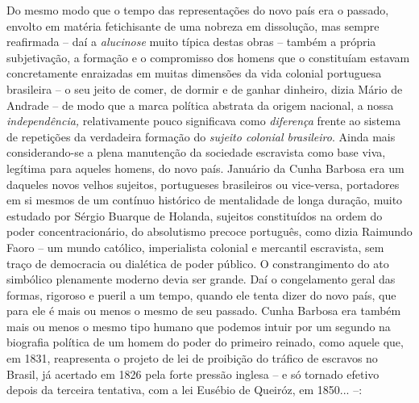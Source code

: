 Do mesmo modo que o tempo das representações do novo país era o passado,
envolto em matéria fetichisante de uma nobreza em dissolução, mas sempre
reafirmada -- daí a \emph{alucinose} muito típica destas obras -- também
a própria subjetivação, a formação e o compromisso dos homens que o
constituíam estavam concretamente enraizadas em muitas dimensões da vida
colonial portuguesa brasileira -- o seu jeito de comer, de dormir e de
ganhar dinheiro, dizia Mário de Andrade -- de modo que a marca política
abstrata da origem nacional, a nossa \emph{independência,} relativamente
pouco significava como \emph{diferença} frente ao sistema de repetições
da verdadeira formação do \emph{sujeito colonial brasileiro}. Ainda mais
considerando-se a plena manutenção da sociedade escravista como base
viva, legítima para aqueles homens, do novo país. Januário da Cunha
Barbosa era um daqueles novos velhos sujeitos, portugueses brasileiros
ou vice-versa, portadores em si mesmos de um contínuo histórico de
mentalidade de longa duração, muito estudado por Sérgio Buarque de
Holanda, sujeitos constituídos na ordem do poder concentracionário, do
absolutismo precoce português, como dizia Raimundo Faoro -- um mundo
católico, imperialista colonial e mercantil escravista, sem traço de
democracia ou dialética de poder público. O constrangimento do ato
simbólico plenamente moderno devia ser grande. Daí o congelamento geral
das formas, rigoroso e pueril a um tempo, quando ele tenta dizer do novo
país, que para ele é mais ou menos o mesmo de seu passado. Cunha Barbosa
era também mais ou menos o mesmo tipo humano que podemos intuir por um
segundo na biografia política de um homem do poder do primeiro reinado,
como aquele que, em 1831, reapresenta o projeto de lei de proibição do
tráfico de escravos no Brasil, já acertado em 1826 pela forte pressão
inglesa -- e só tornado efetivo depois da terceira tentativa, com a lei
Eusébio de Queiróz, em 1850... --:


